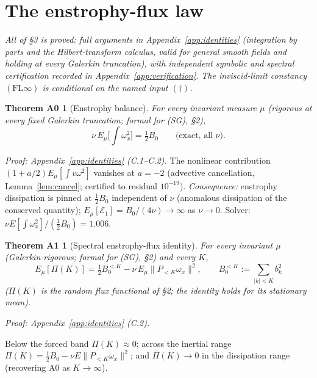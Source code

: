 \documentclass[11pt]{article}
\theoremstyle{remark}
\theoremstyle{plain}
\newtheorem*{thmA0}{Theorem A0}
\newtheorem*{thmA1}{Theorem A1}
\newcommand{\eqdef}{:=}
\begin{document}
\section{The enstrophy-flux law}

\emph{All of \S3 is proved: full arguments in Appendix~\ref{app:identities}
(integration by parts and the Hilbert-transform calculus, valid for general smooth
fields and holding at every Galerkin truncation), with independent symbolic and
spectral certification recorded in Appendix~\ref{app:verification}. The inviscid-limit constancy
$(\mathrm{FL}\infty)$ is conditional on the named input $(\dagger)$.}

\begin{thmA0}[Enstrophy balance]
For every invariant measure $\mu$ (rigorous at every fixed Galerkin truncation;
formal for (SG), \S2),
\begin{equation}
   \nu\, E_\mu\bigl[\textstyle\int\omega_x^2\bigr] = \tfrac12 B_0 \qquad \text{(exact, all } \nu\text{)}.
\end{equation}
\end{thmA0}

\emph{Proof: Appendix~\ref{app:identities} (C.1--C.2).} The nonlinear contribution
$(1+a/2)E_\mu[\int v\omega^2]$ vanishes at $a=-2$ (advective cancellation, Lemma~\ref{lem:cancel};
certified to residual $10^{-19}$). \emph{Consequence:}
enstrophy dissipation is pinned at $\tfrac12 B_0$ independent of $\nu$ (anomalous dissipation
of the conserved quantity); $E_\mu[\mathcal{E}_1] = B_0/(4\nu) \to \infty$ as $\nu\to0$. Solver:
$\nu E[\int\omega_x^2]/(\tfrac12 B_0) = 1.006$.

\begin{thmA1}[Spectral enstrophy-flux identity]
For every invariant $\mu$ (Galerkin-rigorous; formal for (SG), \S2) and every $K$,
\begin{equation}
   E_\mu[\Pi(K)] = \tfrac12 B_0^{<K} - \nu\, E_\mu\|P_{<K}\omega_x\|^2, \qquad B_0^{<K} \eqdef \sum_{|k|<K} b_k^2
\end{equation}
($\Pi(K)$ is the random flux functional of \S2; the identity holds for its stationary mean).
\end{thmA1}

\emph{Proof: Appendix~\ref{app:identities} (C.2).}

Below the forced band $\Pi(K)\approx0$; across the inertial range $\Pi(K) = \tfrac12 B_0 - \nu
E\|P_{<K}\omega_x\|^2$; and $\Pi(K)\to0$ in the dissipation range (recovering A0 as $K\to\infty$).
\end{document}
